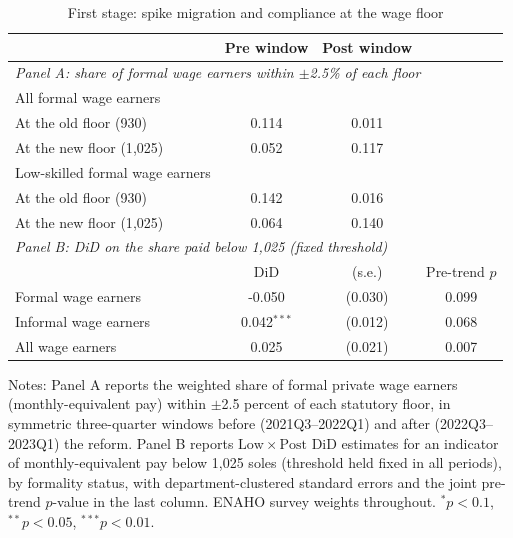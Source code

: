 \begin{table}[!tbp]\centering
\caption{First stage: spike migration and compliance at the wage floor}\label{tab:firststage}
\begin{threeparttable}
\footnotesize
\begin{tabular}{lccc}
\toprule
  & Pre window & Post window & \\
\midrule
\multicolumn{4}{l}{\emph{Panel A: share of formal wage earners within $\pm$2.5\% of each floor}}\\
All formal wage earners & & & \\
\quad At the old floor (930) & 0.114 & 0.011 & \\
\quad At the new floor (1{,}025) & 0.052 & 0.117 & \\
Low-skilled formal wage earners & & & \\
\quad At the old floor (930) & 0.142 & 0.016 & \\
\quad At the new floor (1{,}025) & 0.064 & 0.140 & \\
\midrule
\multicolumn{4}{l}{\emph{Panel B: DiD on the share paid below 1{,}025 (fixed threshold)}}\\
 & DiD & (s.e.) & Pre-trend $p$ \\ \midrule
Formal wage earners & -0.050 & (0.030) & 0.099 \\
Informal wage earners & 0.042$^{***}$ & (0.012) & 0.068 \\
All wage earners & 0.025 & (0.021) & 0.007 \\
\bottomrule
\end{tabular}
\begin{tablenotes}\footnotesize
\item Notes: Panel A reports the weighted share of formal private wage earners (monthly-equivalent pay) within $\pm$2.5 percent of each statutory floor, in symmetric three-quarter windows before (2021Q3--2022Q1) and after (2022Q3--2023Q1) the reform. Panel B reports $\mathrm{Low}\times\mathrm{Post}$ DiD estimates for an indicator of monthly-equivalent pay below 1{,}025 soles (threshold held fixed in all periods), by formality status, with department-clustered standard errors and the joint pre-trend $p$-value in the last column. ENAHO survey weights throughout. $^{*}p<0.1$, $^{**}p<0.05$, $^{***}p<0.01$.
\end{tablenotes}
\end{threeparttable}\end{table}
